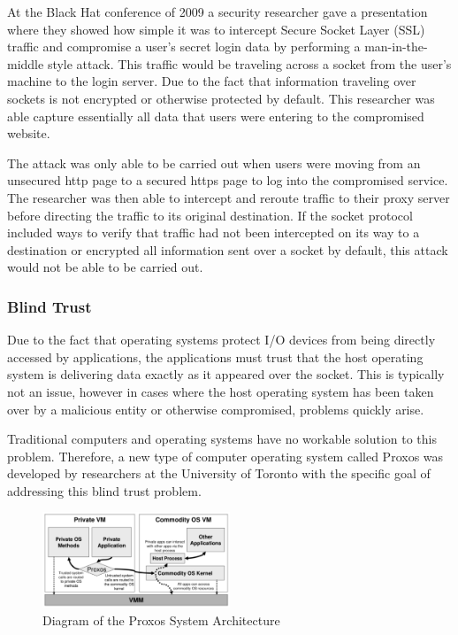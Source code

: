 \documentclass[conference, 12pt]{IEEEtran}
\begin{document}
At the Black Hat conference of 2009 a security researcher gave a presentation where they showed how simple it was to intercept Secure Socket Layer (SSL) traffic and compromise a user’s secret login data by performing a man-in-the-middle style attack\cite{Sheble}. This traffic would be traveling across a socket from the user’s machine to the login server. Due to the fact that information traveling over sockets is not encrypted or otherwise protected by default. This researcher was able capture essentially all data that users were entering to the compromised website.

The attack was only able to be carried out when users were moving from an unsecured http page to a secured https page to log into the compromised service. The researcher was then able to intercept and reroute traffic to their proxy server before directing the traffic to its original destination\cite{Sheble}. If the socket protocol included ways to verify that traffic had not been intercepted on its way to a destination or encrypted all information sent over a socket by default, this attack would not be able to be carried out.

\subsubsection{Blind Trust}
Due to the fact that operating systems protect I/O devices from being directly accessed by applications, the applications must trust that the host operating system is delivering data exactly as it appeared over the socket\cite{Richard}. This is typically not an issue, however in cases where the host operating system has been taken over by a malicious entity or otherwise compromised, problems quickly arise.

Traditional computers and operating systems have no workable solution to this problem. Therefore, a new type of computer operating system called Proxos was developed by researchers at the University of Toronto with the specific goal of addressing this blind trust problem.

\begin{figure}[htbp]
    \centering
    \centerline{\includegraphics[width=0.5\textwidth]{Figure1.png}}
    \caption{Diagram of the Proxos System Architecture \cite{Richard}}
    \label{Figure1}
\end{figure}
\end{document}
